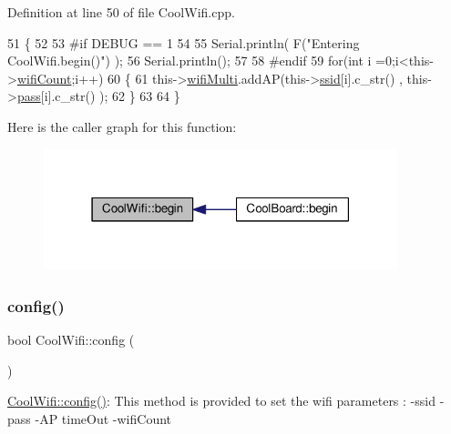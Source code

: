 Definition at line 50 of file Cool\+Wifi.\+cpp.


\begin{DoxyCode}
51 \{ 
52 
53 \textcolor{preprocessor}{#if DEBUG == 1 }
54 
55     Serial.println( F(\textcolor{stringliteral}{"Entering CoolWifi.begin()"}) );
56     Serial.println();
57 
58 \textcolor{preprocessor}{#endif}
59     \textcolor{keywordflow}{for}(\textcolor{keywordtype}{int} i =0;i<this->\hyperlink{class_cool_wifi_ab133bd92fcb895b884deecd6678592e4}{wifiCount};i++)
60     \{
61          this->\hyperlink{class_cool_wifi_a7862a8c0d7239877e2956c14a368aab8}{wifiMulti}.addAP(this->\hyperlink{class_cool_wifi_a893b21d0fed821438733bba2e73fb4c2}{ssid}[i].c\_str() , this->\hyperlink{class_cool_wifi_a0c3332a149245aaad060b32593a54c9b}{pass}[i].c\_str() );    
62     \}
63     
64 \}
\end{DoxyCode}
Here is the caller graph for this function\+:\nopagebreak
\begin{figure}[H]
\begin{center}
\leavevmode
\includegraphics[width=291pt]{d7/d29/class_cool_wifi_a46942fed90e475112cc10b78a32e7aaa_icgraph}
\end{center}
\end{figure}
\mbox{\label{class_cool_wifi_a4eb2f6b9b09dd588964b88b6c70122c0}} 
\subsubsection{\texorpdfstring{config()}{config()}\hspace{0.1cm}{\footnotesize\ttfamily [1/2]}}
{\footnotesize\ttfamily bool Cool\+Wifi\+::config (\begin{DoxyParamCaption}{ }\end{DoxyParamCaption})}

\hyperlink{class_cool_wifi_a4eb2f6b9b09dd588964b88b6c70122c0}{Cool\+Wifi\+::config()}\+: This method is provided to set the wifi parameters \+: -\/ssid -\/pass -\/\+AP time\+Out -\/wifi\+Count

